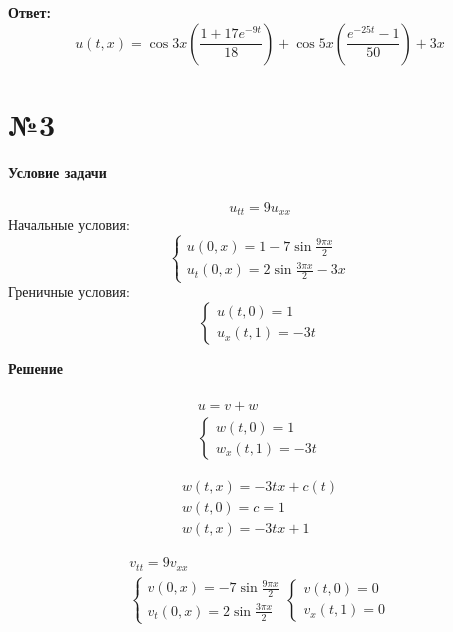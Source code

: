\documentclass[11pt]{article}
\newenvironment{me}{
  \begin{equation}
    \begin{gathered}
      }{
    \end{gathered}
  \end{equation}
}
\newenvironment{ce}{
  \begin{equation}
    \begin{cases}
      }{
    \end{cases}
  \end{equation}
}
\begin{document}
\begin{sloppypar}
  \textbf{Ответ:}
  \begin{equation}
    u(t, x) = \cos{3x}\left(\frac{1 +17e^{-9t}}{18}\right) + \cos{5x}\left(\frac{e^{-25t} - 1}{50}\right) + 3x
  \end{equation}
  
  \section*{№3}
  \textbf{Условие задачи} \\~\\
  
  \begin{equation}
    u_{tt} = 9u_{xx}
  \end{equation}
  Начальные условия:
  \begin{ce}
    u(0, x) = 1 - 7\sin{\frac{9\pi x}{2}} \\
    u_t(0, x) = 2\sin{\frac{3\pi x}{2}} - 3x
  \end{ce}
  Греничные условия:
  \begin{ce}
    u(t, 0) = 1 \\
    u_x(t, 1) = -3t
  \end{ce}
  
  \textbf{Решение} \\~\\
  \begin{me}
    u = v + w \\
    \begin{cases}
      w(t, 0) = 1 \\
      w_x(t, 1) = -3t
    \end{cases}
  \end{me}
  
  \begin{me}
    w(t, x) = -3tx + c(t) \\
    w(t, 0) = c = 1 \\
    w(t, x) = -3tx + 1
  \end{me}
  
  \begin{me}
    v_{tt} = 9v_{xx} \\
    \begin{cases}
      v(0, x) = -7\sin{\frac{9\pi x}{2}} \\
      v_t(0, x) = 2\sin{\frac{3 \pi x}{2}}
    \end{cases} 
    \begin{cases}
      v(t, 0) = 0 \\
      v_x(t, 1) = 0
    \end{cases}
  \end{me}
  

\end{sloppypar}
\end{document}
